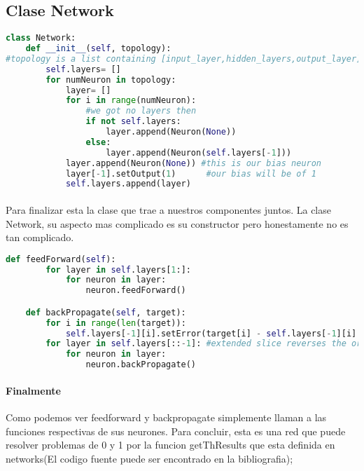 \subsection{Clase Network}
\begin{lstlisting}[language=Python]
class Network:
	def __init__(self, topology):
#topology is a list containing [input_layer,hidden_layers,output_layer]
		self.layers= []
		for numNeuron in topology:
			layer= []
			for i in range(numNeuron):
				#we got no layers then
				if not self.layers:
					layer.append(Neuron(None))
				else:
					layer.append(Neuron(self.layers[-1]))
			layer.append(Neuron(None)) #this is our bias neuron
			layer[-1].setOutput(1)		#our bias will be of 1
			self.layers.append(layer)
\end{lstlisting}
\paragraph{}Para finalizar esta la clase que trae a nuestros componentes juntos. La clase Network, su aspecto mas complicado es su constructor pero honestamente no es tan complicado.
\begin{lstlisting}[language=Python]
	def feedForward(self):
		for layer in self.layers[1:]:
			for neuron in layer:
				neuron.feedForward()

	def backPropagate(self, target):
		for i in range(len(target)):
			self.layers[-1][i].setError(target[i] - self.layers[-1][i].getOutput())
		for layer in self.layers[::-1]: #extended slice reverses the order of self.layers
			for neuron in layer:
				neuron.backPropagate()
\end{lstlisting}
\paragraph{Finalmente} Como podemos ver feedforward y backpropagate simplemente llaman a las funciones respectivas de sus neurones. Para concluir, esta es una red que puede resolver problemas de 0 y 1 por la funcion getThResults que esta definida en networks(El codigo fuente puede ser encontrado en la bibliografia);
